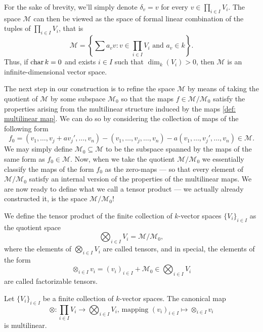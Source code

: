 For the sake of brevity, we'll simply denote \(\delta_v = v\) for every
\(v \in \prod_{i \in I} V_i\). The space \(\mathcal M\) can then be viewed as
the space of formal linear combination of the tuples of \(\prod_{i \in I} V_i\),
that is
\[
    \mathcal M =
    \left\{
        \sum a_v v \colon v \in \prod_{i \in I} V_i \text{ and } a_v \in k
    \right\}.
\]
Thus, if \(\operatorname{char} k = 0\) and exists \(i \in I\) such that \(\dim_k(V_i) > 0\),
then \(\mathcal M\) is an infinite-dimensional vector space.

The next step in our construction is to refine the space \(\mathcal M\) by means
of taking the quotient of \(\mathcal M\) by some subspace \(\mathcal M_0\) so
that the maps \(f \in \mathcal M / \mathcal M_0\) satisfy the properties arising
from the multilinear structure induced by the maps \cref{def: multilinear map}.
We can do so by considering the collection of maps of the following form
\[
    f_0 = (v_1, \dots, v_j + av_j', \dots, v_n)
    - (v_1, \dots, v_j, \dots, v_n)
    - a(v_1, \dots, v_j', \dots, v_n) \in \mathcal M.
\]
We may simply define \(\mathcal M_0 \subseteq \mathcal M\) to be the subspace spanned by
the maps of the same form as \(f_0 \in \mathcal M\). Now, when we take the
quotient \(\mathcal M / \mathcal M_0\) we essentially classify the maps of the
form \(f_0\) as the zero-maps --- so that every element of \(\mathcal M / \mathcal M_0\)
satisfy an internal version of the properties of the multilinear maps. We
are now ready to define what we call a tensor product --- we actually already
constructed it, is the space \(\mathcal M / \mathcal M_{0}\)!

\begin{definition}\label{def: tensor product}
    We define the tensor product of the finite collection of \(k\)-vector spaces
    \(\{V_i\}_{i \in I}\) as the quotient space
    \[
        \bigotimes_{i \in I} V_i = \mathcal M / \mathcal M_0,
    \]
    where the elements of \(\bigotimes_{i \in I} V_i\) are called tensors, and in
    special, the elements of the form
    \[
        \otimes_{i \in I} v_i = (v_i)_{i \in I} + \mathcal M_0 \in \bigotimes_{i \in I} V_i
    \]
    are called factorizable tensors.
\end{definition}

\begin{lemma}\label{lem: tensor map}
    Let \(\{V_i\}_{i \in I}\) be a finite collection of \(k\)-vector spaces. The
    canonical map
    \[
        \otimes: \prod_{i \in I} V_i \to \bigotimes_{i \in I} V_i
        \text{, mapping }
        (v_i)_{i \in I} \longmapsto \otimes_{i \in I} v_i
    \]
    is multilinear.
\end{lemma}

